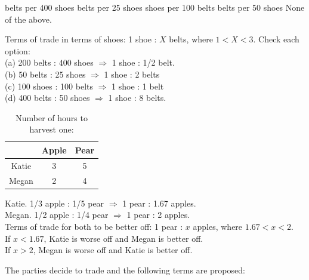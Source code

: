 \documentclass[addpoints,11pt]{exam}
\theoremstyle{definition}
\begin{document}
\begin{questions}
\begin{choices}
	 belts per 400 shoes
	 belts per 25 shoes
	 shoes per 100 belts
	 belts per 50 shoes
	\choice None of the above.
\end{choices}

	\begin{solution}
		Terms of trade in terms of shoes: 1 shoe : $X$ belts, where $1<X<3$. Check each option: \\
		(a) 200 belts : 400 shoes $\Rightarrow$ 1 shoe : 1/2 belt. \\
		(b) 50 belts : 25 shoes $\Rightarrow$ 1 shoe : 2 belts \\
		(c) 100 shoes : 100 belts $\Rightarrow$ 1 shoe : 1 belt \\
		(d) 400 belts : 50 shoes $\Rightarrow$ 1 shoe : 8 belts.
	\end{solution}
	

\begin{table}[H]
	\caption{Number of hours to harvest one:}
	\centering
	\begin{tabular}{ c|c|c} 
		
		& Apple & Pear \\
		\hline
		Katie & 3 & 5 \\
		Megan & 2 & 4 \\
	\end{tabular}
	\label{MC8}
\end{table}

\begin{solution}
	Katie. 1/3 apple : 1/5 pear $\Rightarrow$ 1 pear : 1.67 apples.\\
	Megan. 1/2 apple : 1/4 pear $\Rightarrow$ 1 pear : 2 apples. \\
	Terms of trade for both to be better off: 1 pear : $x$ apples, where $1.67 < x < 2$. \\
	If $x<1.67$, Katie is worse off and Megan is better off. \\
	If $x>2$, Megan is worse off and Katie is better off.\\
\end{solution}

The parties decide to trade and the following terms are proposed:


\end{questions}
\end{document}
